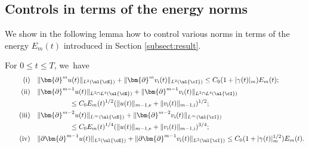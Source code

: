 \subsection{Controls in terms of the energy norms}\label{sectCEN}
We show in the following lemma how to control various norms in terms of the energy $E_m(t)$ introduced in Section \ref{subsect:result}.

\begin{lemma}\label{lem:EstDuv}
For $0\leq t\leq T$, we~have\enlargethispage{\baselineskip}
\begin{align*}
\tag{i}\label{lem:EstDuvi} &\quad
\|\bm{\partial}^m u(t)\|_{L^2(\ul{\cE})} + \|\bm{\partial}^m v_\mathrm{i}(t)\|_{L^2(\ul{\cI})} \leq C_0(1+|\gamma(t)|_m)E_m(t); \\
\tag{ii}\label{lem:EstDuvii} &\quad
\|\bm{\partial}^{m-1} u(t)\|_{L^2\cap L^4(\ul{\cE})} + \|\bm{\partial}^{m-1} v_\mathrm{i}(t)\|_{L^2\cap L^4(\ul{\cI})} \\
&\hspace{2cm} \leq C_0 E_m(t)^{1/2} (\|u(t)\|_{m-1,{\rm e}} + \|v_\mathrm{i}(t)\|_{m-1,{\rm i}})^{1/2}; \\
\tag{iii}\label{lem:EstDuviii} &\quad
\|\bm{\partial}^{m-2} u(t)\|_{L^\infty(\ul{\cE})} + \|\bm{\partial}^{m-2} v_\mathrm{i}(t)\|_{L^\infty(\ul{\cI})} \\
&\hspace{2cm} \leq C_0 E_m(t)^{1/4} (\|u(t)\|_{m-1,{\rm e}} + \|v_\mathrm{i}(t)\|_{m-1,{\rm i}})^{3/4}; \\
\tag{iv}\label{lem:EstDuviv} &\quad
\|\partial\bm{\partial}^{m-1} u(t)\|_{L^2(\ul{\cE})} + \|\partial\bm{\partial}^{m-1} v_\mathrm{i}(t)\|_{L^2(\ul{\cI})} \leq C_0(1+|\gamma(t)|_m^{1/2})E_m(t).
\end{align*}
\end{lemma}

